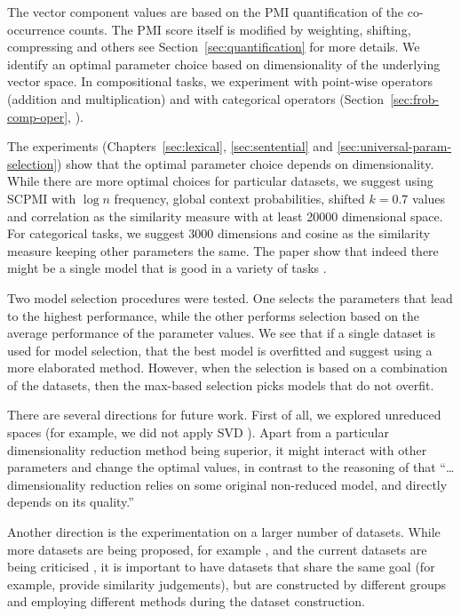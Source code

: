 \documentclass[11pt,a4paper,english,oneside]{book}
\newcommand\newcite\citet
\renewcommand\cite\citep
\begin{document}
The vector component values are based on the PMI quantification of the co-occurrence counts. The PMI score itself is modified by weighting, shifting, compressing and others see Section~\ref{sec:quantification} for more details. We identify an optimal parameter choice based on dimensionality of the underlying vector space. In compositional tasks, we experiment with point-wise operators (addition and multiplication) and with categorical operators (Section~\ref{sec:frob-comp-oper}, \newcite{DBLP:journals/corr/abs-1003-4394}).

The experiments (Chapters~\ref{sec:lexical}, \ref{sec:sentential} and \ref{sec:universal-param-selection}) show that the optimal parameter choice depends on dimensionality. While there are more optimal choices for particular datasets, we suggest using SCPMI with $\log n$ frequency, global context probabilities, shifted $k=0.7$ values and correlation as the similarity measure with at least 20000 dimensional space. For categorical tasks, we suggest 3000 dimensions and cosine as the similarity measure keeping other parameters the same. The paper show that indeed there might be a single model that is good in a variety of tasks \cite{doi:10.1080/02643294.2016.1176907}.

Two model selection procedures were tested. One selects the parameters that lead to the highest performance, while the other performs selection based on the average performance of the parameter values. We see that if a single dataset is used for model selection, that the best model is overfitted and suggest using a more elaborated method. However, when the selection is based on a combination of the datasets, then the max-based selection picks models that do not overfit.

There are several directions for future work. First of all, we explored unreduced spaces (for example, we did not apply SVD \newcite{BullinariaLevy2012}). Apart from a particular dimensionality reduction method being superior, it might interact with other parameters \cite{lapesa2014large} and change the optimal values, in contrast to the reasoning of \newcite{kiela-clark:2014:CVSC} that ``\ldots dimensionality reduction relies on some original non-reduced model, and directly depends on its quality.''

Another direction is the experimentation on a larger number of datasets. While more datasets are being proposed, for example \newcite{2016arXiv160800869G}, and the current datasets are being criticised \cite{RepEval:2016}, it is important to have datasets that share the same goal (for example, provide similarity judgements), but are constructed by different groups and employing different methods during the dataset construction.
\end{document}
